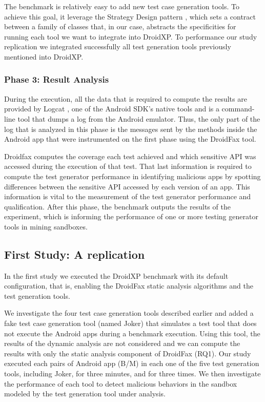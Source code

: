 The benchmark is relatively easy to add new test
case generation tools. To achieve this goal, it leverage the Strategy Design pattern \cite{patterns-book}, which sets a contract between a family of classes that, in our case, abstracts the specificities for running each tool we want to integrate into DroidXP. To performance our study replication we integrated successfully all test generation tools previously mentioned into DroidXP. 

\subsubsection{Phase 3: Result Analysis}

During the execution, all the data that is required to compute the results are provided by Logcat \cite{Logcat}, one of the Android SDK's native tools and is a command-line tool that dumps a log from the Android emulator. Thus, the only part of the log that is analyzed in this phase is the messages sent by the methods inside the Android app that were instrumented on the first phase using the DroidFax tool. 

Droidfax computes the coverage each test achieved and which sensitive API was accessed during the execution of that test. That last information is required to compute the test generator performance in identifying malicious apps by spotting differences between the sensitive API accessed by each version of an app. This information is vital to the measurement of the test generator performance and qualification. After this phase, the benchmark outputs the results of the experiment, which is informing the performance of one or more testing generator tools in mining sandboxes.

\subsection{First Study: A replication \blls}

In the first study we executed the DroidXP benchmark with its
default configuration, that is, enabling the DroidFax
static analysis algorithms and the test generation tools.

We investigate the four test case generation tools described earlier and added a fake test
case generation tool (named Joker) that simulates a test tool that does not execute
the Android apps during a benchmark execution. Using this tool, the results
of the dynamic analysis are not considered and we can compute the results with
only the static analysis component of DroidFax (RQ1). Our study executed each pairs of
Android app (B/M) in each one of the five test generation tools, including Joker,
for three minutes, and for three times. We then investigate the performance of each tool to detect malicious behaviors in the sandbox modeled by the test generation tool
under analysis. 

